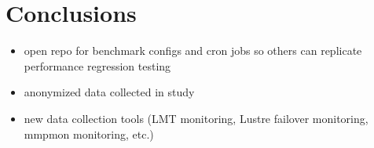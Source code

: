 \section{Conclusions} \label{sec:conclusions}

\begin{itemize}
\item open repo for benchmark configs and cron jobs so others can replicate
performance regression testing
\item anonymized data collected in study
\item new data collection tools (LMT monitoring, Lustre failover monitoring,
mmpmon monitoring, etc.)
\end{itemize}
